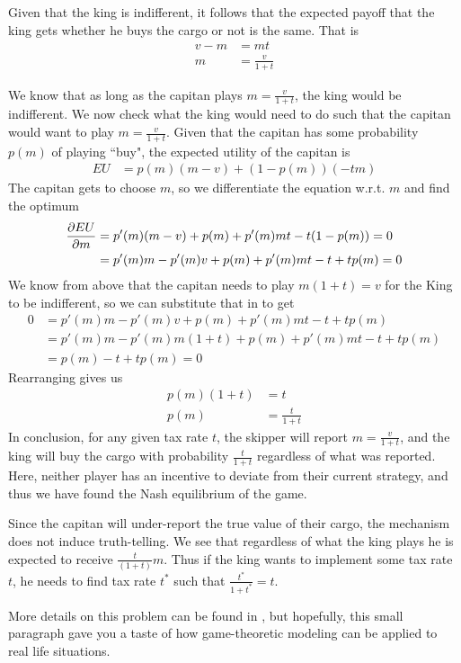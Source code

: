 Given that the king is indifferent, it follows that the expected payoff that the king gets whether he buys the cargo or not is the same. That is
\begin{align*}
    v - m &= mt \\
    m &= \frac{v}{1 + t}
\end{align*}

We know that as long as the capitan plays $m = \frac{v}{1 + t}$, the king would be indifferent. We now check what the king would need to do such that the capitan would want to play $m = \frac{v}{1+t}$. Given that the capitan has some probability $p(m)$ of playing ``buy", the expected utility of the capitan is
\begin{align*}
    EU &= p(m)(m - v) + (1 - p(m))(-tm)
\end{align*}
The capitan gets to choose $m$, so we differentiate the equation w.r.t. $m$ and find the optimum
\begin{align*}
    \frac{\partial EU}{\partial m} & = p'(m)(m-v) + p(m) + p'(m)mt -t(1-p(m)) = 0 \\
    & = p'(m)m - p'(m)v + p(m) + p'(m)mt -t + tp(m) = 0
\end{align*}
We know from above that the capitan needs to play $m(1+t) = v$ for the King to be indifferent, so we can substitute that in to get
\begin{align*}
    0 & = p'(m)m - p'(m)v + p(m) + p'(m)mt -t + tp(m) \\
    & =  p'(m)m - p'(m)m(1+t)  + p(m) + p'(m)mt -t + tp(m) \\
    & = p(m) -t + tp(m) = 0
\end{align*}
Rearranging gives us
\begin{align*}
    p(m)(1 + t) & = t\\
    p(m) & = \frac{t}{1+t}
\end{align*}
In conclusion, for any given tax rate $t$, the skipper will report $m = \frac{v}{1+t}$, and the king will buy the cargo with probability $\frac{t}{1+t}$ regardless of what was reported. Here, neither player has an incentive to deviate from their current strategy, and thus we have found the Nash equilibrium of the game. 

Since the capitan will under-report the true value of their cargo, the mechanism does not induce truth-telling. We see that regardless of what the king plays he is expected to receive $\frac{t}{(1+t)}m$. Thus if the king wants to implement some tax rate $t$, he needs to find tax rate $t^*$ such that $\frac{t^*}{1+t^*} = t$.

More details on this problem can be found in \citet{Haan_2012_Taxation}, but hopefully, this small paragraph gave you a taste of how game-theoretic modeling can be applied to real life situations. 
